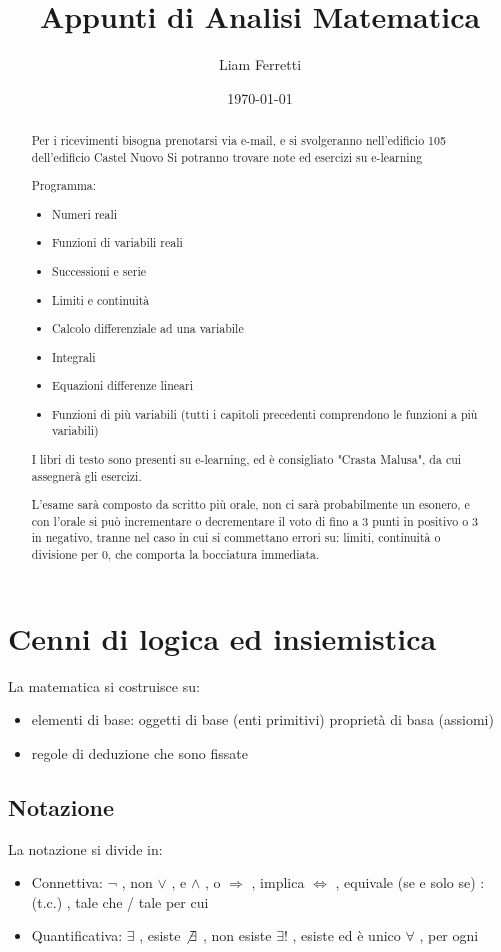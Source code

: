 \documentclass[a4paper,12pt]{article}
\title{Appunti di Analisi Matematica}
\author{Liam Ferretti}
\date{\today}
\begin{document}
	
	\maketitle
	
	\begin{abstract}
		Per i ricevimenti bisogna prenotarsi via e-mail, e si svolgeranno nell'edificio 105 dell'edificio Castel Nuovo
		Si potranno trovare note ed esercizi su e-learning
		
		Programma:
		\begin{itemize}
		\item Numeri reali  
		\item Funzioni di variabili reali  
		\item Successioni e serie
		\item Limiti e continuità
		\item Calcolo differenziale ad una variabile  
		\item Integrali
		\item Equazioni differenze lineari  
		\item Funzioni di più variabili (tutti i capitoli precedenti comprendono le funzioni a più variabili)
		\end{itemize}
		I libri di testo sono presenti su e-learning, ed è consigliato "Crasta Malusa", da cui assegnerà gli esercizi.
		
		L'esame sarà composto da scritto più orale, non ci sarà probabilmente un esonero, e con l'orale si può incrementare o decrementare il voto di fino a 3 punti in positivo o 3 in negativo, tranne nel caso in cui si commettano errori su: limiti, continuità o divisione per 0, che comporta la bocciatura immediata.
	\end{abstract}
	
	\newpage
	\tableofcontents
	\clearpage
	
	\section{Cenni di logica ed insiemistica}
		La matematica si costruisce su:
		\begin{itemize}
			\item elementi di base:
				\subitem oggetti di base (enti primitivi)
				\subitem proprietà di basa (assiomi)
			\item regole di deduzione che sono fissate
		\end{itemize}
	\subsection{Notazione}
	La notazione si divide in:
	\begin{itemize}
		\item Connettiva:
			\subitem $\neg$ , non
			\subitem $\vee$ ,  e
			\subitem $\wedge$ , o
			\subitem $\Rightarrow$ , implica 
			\subitem $\iff$ , equivale (se e solo se)
			\subitem : (t.c.) , tale che / tale per cui
		\item Quantificativa:
			\subitem $\exists$ , esiste
			\subitem $\not \exists$ , non esiste
			\subitem $\exists!$ , esiste ed è unico
			\subitem $\forall$ , per ogni
	\end{itemize}
\end{document}
